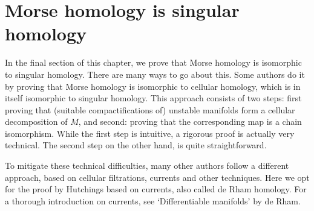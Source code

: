\filbreak
\section{Morse homology is singular homology}

In the final section of this chapter, we prove that Morse homology is isomorphic to singular homology.
There are many ways to go about this.
Some authors do it by proving that Morse homology is isomorphic to cellular homology, which is in itself isomorphic to singular homology.
This approach consists of two steps: first proving that (suitable compactifications of) unstable manifolds form a cellular decomposition of $M$, and second: proving that the corresponding map is a chain isomorphism.
While the first step is intuitive, a rigorous proof is actually very technical.
The second step on the other hand, is quite straightforward.

To mitigate these technical difficulties, many other authors follow a different approach, based on cellular filtrations, currents and other techniques.
Here we opt for the proof by Hutchings based on currents, also called de Rham homology.
For a thorough introduction on currents, see `Differentiable manifolds' by de Rham.

